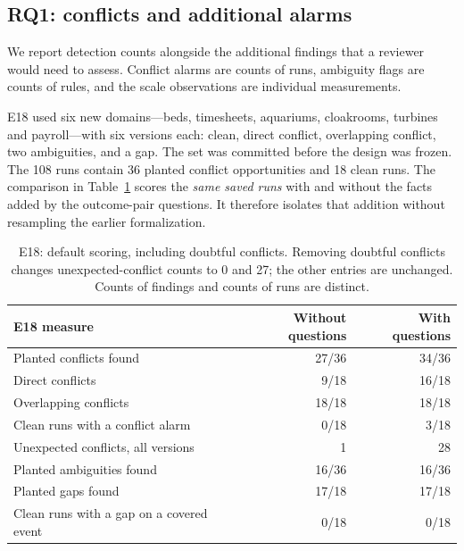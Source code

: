 \subsection{RQ1: conflicts and additional alarms}\label{sec:rq1}

We report detection counts alongside the additional findings that a reviewer would need to assess. Conflict alarms are counts of runs, ambiguity flags are counts of rules, and the scale observations are individual measurements.

E18 used six new domains---beds, timesheets, aquariums, cloakrooms, turbines and
payroll---with six versions each: clean, direct conflict, overlapping conflict,
two ambiguities, and a gap. The set was committed before the design was frozen.
The 108 runs contain 36 planted conflict opportunities and 18 clean runs.
The comparison in Table~\ref{tab:e18} scores the \emph{same saved runs} with and
without the facts added by the outcome-pair questions. It therefore isolates
that addition without resampling the earlier formalization.

\begin{table}[H]
\centering
\small
\begin{tabularx}{\linewidth}{@{}Xrr@{}}
\toprule
E18 measure & Without questions & With questions \\
\midrule
Planted conflicts found & 27/36 & 34/36 \\
\quad Direct conflicts & 9/18 & 16/18 \\
\quad Overlapping conflicts & 18/18 & 18/18 \\
Clean runs with a conflict alarm & 0/18 & 3/18 \\
Unexpected conflicts, all versions & 1 & 28 \\
Planted ambiguities found & 16/36 & 16/36 \\
Planted gaps found & 17/18 & 17/18 \\
Clean runs with a gap on a covered event & 0/18 & 0/18 \\
\bottomrule
\end{tabularx}
\caption{E18: default scoring, including doubtful conflicts. Removing doubtful
conflicts changes unexpected-conflict counts to 0 and 27; the other entries
are unchanged. Counts of findings and counts of runs are distinct.}
\label{tab:e18}
\end{table}

